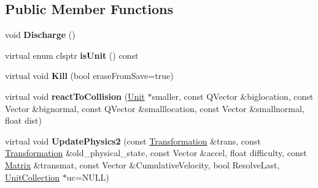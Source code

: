 \subsection*{Public Member Functions}
\begin{DoxyCompactItemize}
\item 
void {\bfseries Discharge} ()\hypertarget{classMissile_a8bdc5391e720476ccb8160cf47ce0079}{}\label{classMissile_a8bdc5391e720476ccb8160cf47ce0079}

\item 
virtual enum clsptr {\bfseries is\+Unit} () const \hypertarget{classMissile_a379f7cb23e9c802881d1edb9d78f00db}{}\label{classMissile_a379f7cb23e9c802881d1edb9d78f00db}

\item 
virtual void {\bfseries Kill} (bool erase\+From\+Save=true)\hypertarget{classMissile_ac8f63ed4b6e46aa63ede952618ba572f}{}\label{classMissile_ac8f63ed4b6e46aa63ede952618ba572f}

\item 
virtual void {\bfseries react\+To\+Collision} (\hyperlink{classUnit}{Unit} $\ast$smaller, const Q\+Vector \&biglocation, const Vector \&bignormal, const Q\+Vector \&smalllocation, const Vector \&smallnormal, float dist)\hypertarget{classMissile_a1a092f2f60e4f7024a1835572d7ddcbf}{}\label{classMissile_a1a092f2f60e4f7024a1835572d7ddcbf}

\item 
virtual void {\bfseries Update\+Physics2} (const \hyperlink{structTransformation}{Transformation} \&trans, const \hyperlink{structTransformation}{Transformation} \&old\+\_\+physical\+\_\+state, const Vector \&accel, float difficulty, const \hyperlink{classMatrix}{Matrix} \&transmat, const Vector \&Cumulative\+Velocity, bool Resolve\+Last, \hyperlink{classUnitCollection}{Unit\+Collection} $\ast$uc=N\+U\+LL)\hypertarget{classMissile_a64c44acf26daf2b89bf6aac46b9d6571}{}\label{classMissile_a64c44acf26daf2b89bf6aac46b9d6571}

\end{DoxyCompactItemize}
